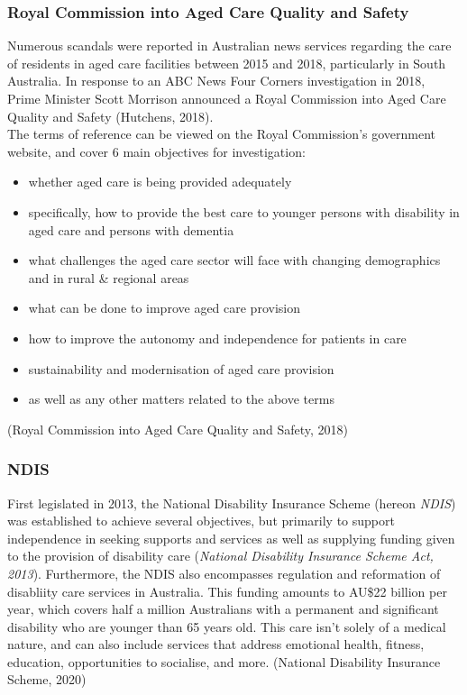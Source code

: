 \documentclass[
  11pt,
]{article}
\providecommand{\tightlist}{%
  \setlength{\itemsep}{0pt}\setlength{\parskip}{0pt}}
\begin{document}
\newpage

\hypertarget{royal-commission-into-aged-care-quality-and-safety}{%
\subsubsection{Royal Commission into Aged Care Quality and Safety}\label{royal-commission-into-aged-care-quality-and-safety}}

Numerous scandals were reported in Australian news services regarding the care of residents in aged care facilities between 2015 and 2018, particularly in South Australia. In response to an ABC News Four Corners investigation in 2018, Prime Minister Scott Morrison announced a Royal Commission into Aged Care Quality and Safety (Hutchens, 2018).\\
The terms of reference can be viewed on the Royal Commission's government website, and cover 6 main objectives for investigation:

\begin{itemize}
\tightlist
\item
  whether aged care is being provided adequately
\item
  specifically, how to provide the best care to younger persons with disability in aged care and persons with dementia
\item
  what challenges the aged care sector will face with changing demographics and in rural \& regional areas
\item
  what can be done to improve aged care provision
\item
  how to improve the autonomy and independence for patients in care
\item
  sustainability and modernisation of aged care provision
\item
  as well as any other matters related to the above terms
\end{itemize}

(Royal Commission into Aged Care Quality and Safety, 2018)

\hypertarget{ndis}{%
\subsubsection{NDIS}\label{ndis}}

First legislated in 2013, the National Disability Insurance Scheme (hereon \emph{NDIS}) was established to achieve several objectives, but primarily to support independence in seeking supports and services as well as supplying funding given to the provision of disability care (\emph{National Disability Insurance Scheme Act, 2013}). Furthermore, the NDIS also encompasses regulation and reformation of disabliity care services in Australia. This funding amounts to AU\$22 billion per year, which covers half a million Australians with a permanent and significant disability who are younger than 65 years old. This care isn't solely of a medical nature, and can also include services that address emotional health, fitness, education, opportunities to socialise, and more. (National Disability Insurance Scheme, 2020)
\end{document}
